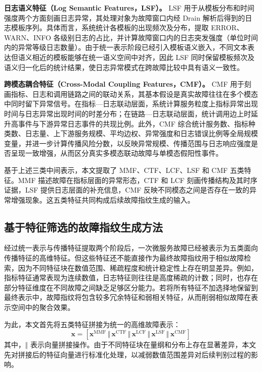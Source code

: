 \textbf{日志语义特征（Log Semantic Features，LSF）。}
LSF 用于从模板分布和时间强度两个方面刻画日志异常，其处理对象为故障窗口内经 Drain 解析后得到的日志模板序列。具体而言，系统统计各模板的出现频次及分布，提取 ERROR、WARN、INFO 各级别日志的占比，并计算故障窗口内的日志突发强度（单位时间内的异常等级日志数量）。由于统一表示阶段已经引入模板语义嵌入，不同文本表达但语义相近的模板能够在统一语义空间中对齐，因此 LSF 同时保留模板频次及语义归一化后的统计结果，使日志异常模式在跨故障比较中具有语义一致性。

\textbf{跨模态耦合特征（Cross-Modal Coupling Features，CMF）。}
CMF 用于刻画指标、日志和调用链路之间的联动关系，其基本假设是真实故障往往在多个模态中同时留下异常信号。在指标—日志联动层面，系统计算服务粒度上指标异常出现时间与日志异常出现时间的时差分布；在链路—日志联动层面，统计调用边上时延升高事件与下游异常日志事件的共现比例。此外，CMF 综合统计服务数、指标种类数、日志量、上下游服务规模、平均边权、异常强度和日志错误比例等全局规模变量，并进一步计算传播风险分数，以反映异常规模、传播范围与日志响应强度是否呈现一致增强，从而区分真实多模态联动故障与单模态假阳性事件。

基于上述三类中间表示，本文提取了 MMF、CTF、LCF、LSF 和 CMF 五类特征。MMF 描述故障在指标层面的异常形态，CTF 和 LCF 刻画传播结构及其时序证据，LSF 提供日志层面的补充信息，CMF 反映不同模态之间是否存在一致的异常增强现象。这五类特征共同构成后续故障指纹生成的输入。

\subsection{基于特征筛选的故障指纹生成方法}

经过统一表示与传播特征提取两个阶段后，一次微服务故障已经被表示为五类面向传播特征的高维特征。但这些特征还不能直接作为最终故障指纹用于相似故障检索，因为不同特征块在数值范围、稀疏程度和统计稳定性上存在明显差异。例如，指标特征通常表现为连续数值，日志特征则往往是高度稀疏的计数；同时，也存在部分特征维度在不同故障之间缺乏足够区分能力。若将所有特征不加选择地保留到最终表示中，故障指纹将包含较多冗余特征和弱相关特征，从而削弱相似故障在表示空间中的聚合效果。

为此，本文首先将五类特征拼接为统一的高维故障表示：
\begin{equation}
\mathbf{x} =
\left[
\mathbf{x}^{\text{MMF}} \,\Vert\,
\mathbf{x}^{\text{CTF}} \,\Vert\,
\mathbf{x}^{\text{LCF}} \,\Vert\,
\mathbf{x}^{\text{LSF}} \,\Vert\,
\mathbf{x}^{\text{CMF}}
\right]
\end{equation}
其中，$\Vert$ 表示向量拼接操作。由于不同特征块在量纲和分布上存在显著差异，本文先对拼接后的特征向量进行标准化处理，以减弱数值范围差异对后续判别过程的影响。

